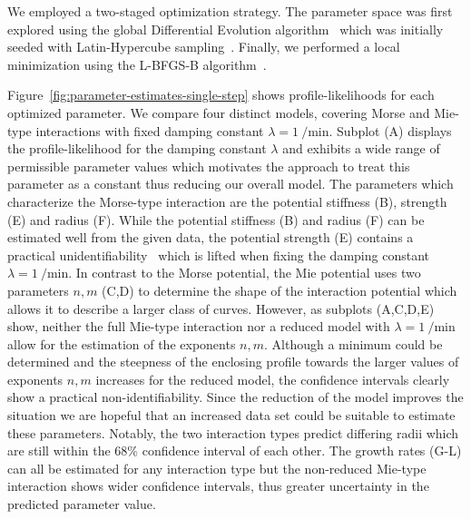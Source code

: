 We employed a two-staged optimization strategy.
The parameter space was first explored using the global Differential Evolution
algorithm~\cite{Storn1997} which was initially seeded with Latin-Hypercube
sampling~\cite{McKay1979}.
Finally, we performed a local minimization using the L-BFGS-B algorithm~\cite{Liu1989}.

Figure~\ref{fig:parameter-estimates-single-step} shows profile-likelihoods for each optimized
parameter.
We compare four distinct models, covering Morse and Mie-type interactions with fixed damping
constant $\lambda=\SI{1}{\per\minute}$.
Subplot (A) displays the profile-likelihood for the damping constant $\lambda$ and
exhibits a wide
range of permissible parameter values which motivates the approach to treat this parameter as a
constant thus reducing our overall model.
The parameters which characterize the Morse-type interaction are the potential stiffness (B),
strength (E) and radius (F).
While the potential stiffness (B) and radius (F) can be estimated well from the given data, the
potential strength (E) contains a practical unidentifiability~\cite{Raue2009} which
is lifted when
fixing the damping constant $\lambda=\SI{1}{\per\minute}$.
In contrast to the Morse potential, the Mie potential uses two parameters $n,m$ (C,D)
to determine
the shape of the interaction potential which allows it to describe a larger class of curves.
However, as subplots (A,C,D,E) show, neither the full Mie-type interaction nor a
reduced model with
$\lambda=\SI{1}{\per\minute}$ allow for the estimation of the exponents $n,m$.
Although a minimum could be determined and the steepness of the enclosing profile
towards the larger
values of exponents $n,m$ increases for the reduced model, the confidence intervals
clearly show a
practical non-identifiability.
Since the reduction of the model improves the situation we are hopeful that an
increased data set
could be suitable to estimate these parameters.
Notably, the two interaction types predict differing radii which are still within the $68\%$
confidence interval of each other.
The growth rates (G-L) can all be estimated for any interaction type but the
non-reduced Mie-type
interaction shows wider confidence intervals, thus greater uncertainty in the
predicted parameter
value.

